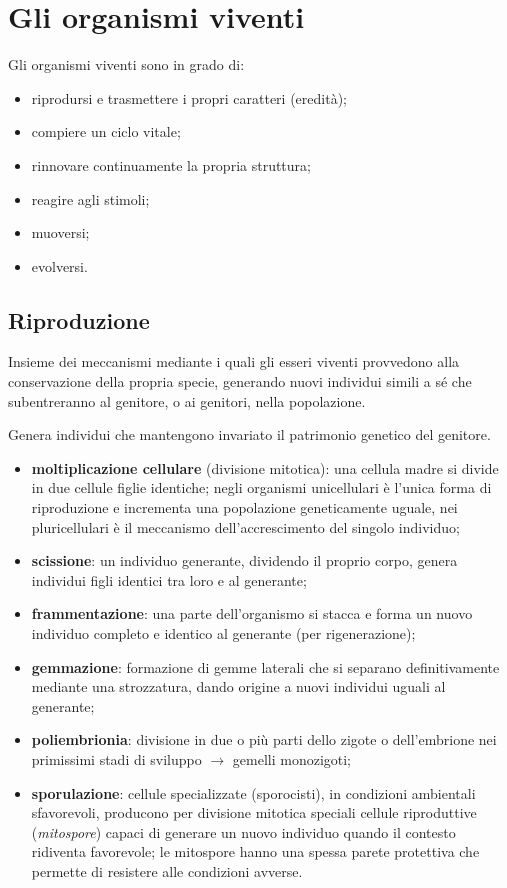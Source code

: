 \section{Gli organismi viventi}

Gli organismi viventi sono in grado di:
\begin{itemize}
  \item riprodursi e trasmettere i propri caratteri (eredità);
  \item compiere un ciclo vitale;
  \item rinnovare continuamente la propria struttura;
  \item reagire agli stimoli;
  \item muoversi;
  \item evolversi.
\end{itemize}

\subsection{Riproduzione}

Insieme dei meccanismi mediante i quali gli esseri viventi provvedono alla conservazione della propria specie, generando nuovi individui simili a sé che subentreranno al genitore, o ai genitori, nella popolazione.

Genera individui che mantengono invariato il patrimonio genetico del genitore.
\begin{itemize}
  \item \textbf{moltiplicazione cellulare} (divisione mitotica): una cellula madre si divide in due cellule figlie identiche; negli organismi unicellulari è l'unica forma di riproduzione e incrementa una popolazione geneticamente uguale, nei pluricellulari è il meccanismo dell'accrescimento del singolo individuo;
  \item \textbf{scissione}: un individuo generante, dividendo il proprio corpo, genera individui figli identici tra loro e al generante;
  \item \textbf{frammentazione}: una parte dell'organismo si stacca e forma un nuovo individuo completo e identico al generante (per rigenerazione);
  \item \textbf{gemmazione}: formazione di gemme laterali che si separano definitivamente mediante una strozzatura, dando origine a nuovi individui uguali al generante;
  \item \textbf{poliembrionia}: divisione in due o più parti dello zigote o dell'embrione nei primissimi stadi di sviluppo $\rightarrow$ gemelli monozigoti;
  \item \textbf{sporulazione}: cellule specializzate (sporocisti), in condizioni ambientali sfavorevoli, producono per divisione mitotica speciali cellule riproduttive (\textit{mitospore}) capaci di generare un nuovo individuo quando il contesto ridiventa favorevole; le mitospore hanno una spessa parete protettiva che permette di resistere alle condizioni avverse.
\end{itemize}

